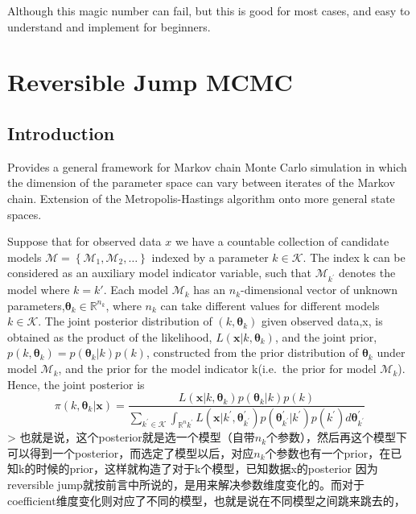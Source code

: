 \documentclass[
]{book}
\theoremstyle{definition}
\theoremstyle{definition}
\theoremstyle{definition}
\theoremstyle{remark}
\begin{document}
Although this magic number can fail, but this is good for most cases, and easy to understand and implement for beginners.

\hypertarget{reversible-jump-mcmc}{%
\chapter{Reversible Jump MCMC}\label{reversible-jump-mcmc}}

\hypertarget{introduction}{%
\section{Introduction}\label{introduction}}

Provides a general framework for Markov chain Monte Carlo simulation in which the dimension of the parameter space can vary between iterates of the Markov chain. Extension of the Metropolis-Hastings algorithm onto more general state spaces.

Suppose that for observed data \(x\) we have a countable collection of candidate models \(\mathcal{M}=\left\{\mathcal{M}_{1}, \mathcal{M}_{2}, \ldots\right\}\) indexed by a parameter \(k \in \mathcal{K}\). The index k can be considered as an auxiliary model indicator variable, such that \(\mathcal{M}_{k^{\prime}}\) denotes the model where \(k=k'\). Each model \(\mathcal{M}_k\) has an \(n_k\)-dimensional vector of unknown parameters,\(\boldsymbol{\theta}_{k} \in \mathbb{R}^{n_{k}}\), where \(n_k\) can take different values for different models \(k\in\mathcal K\). The joint posterior distribution of \((k,\boldsymbol{\theta}_k)\) given observed data,x, is obtained as the product of the likelihood, \(L\left(\mathbf{x} | k, \boldsymbol{\theta}_{k}\right)\), and the joint prior, \(p\left(k, \boldsymbol{\theta}_{k}\right)=p\left(\boldsymbol{\theta}_{k} | k\right) p(k)\), constructed from the prior distribution of \(\boldsymbol \theta_k\) under model \(\mathcal M_k\), and the prior for the model indicator k(i.e.~the prior for model \(\mathcal M_k\)). Hence, the joint posterior is
\[
\pi\left(k, \boldsymbol{\theta}_{k} | \mathbf{x}\right)=\frac{L\left(\mathbf{x} | k, \boldsymbol{\theta}_{k}\right) p\left(\boldsymbol{\theta}_{k} | k\right) p(k)}{\sum_{k^{\prime} \in \mathcal{K}} \int_{\mathbb{R}^{n} k^{\prime}} L\left(\mathbf{x} | k^{\prime}, \boldsymbol{\theta}_{k^{\prime}}^{\prime}\right) p\left(\boldsymbol{\theta}_{k^{\prime}}^{\prime} | k^{\prime}\right) p\left(k^{\prime}\right) d \boldsymbol{\theta}_{k^{\prime}}^{\prime}}
\]
\textgreater{} 也就是说，这个posterior就是选一个模型（自带\(n_k\)个参数），然后再这个模型下可以得到一个posterior，而选定了模型以后，对应\(n_k\)个参数也有一个prior，在已知k的时候的prior，这样就构造了对于k个模型，已知数据x的posterior
因为reversible jump就按前言中所说的，是用来解决参数维度变化的。而对于coefficient维度变化则对应了不同的模型，也就是说在不同模型之间跳来跳去的，
\end{document}
